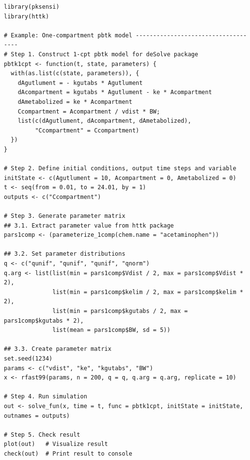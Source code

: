 \documentclass[preprint,12pt, a4paper]{elsarticle}
\begin{document}
\begin{lstlisting}
library(pksensi)
library(httk)

# Example: One-compartment pbtk model ------------------------------------
# Step 1. Construct 1-cpt pbtk model for deSolve package
pbtk1cpt <- function(t, state, parameters) {
  with(as.list(c(state, parameters)), {
    dAgutlument = - kgutabs * Agutlument
    dAcompartment = kgutabs * Agutlument - ke * Acompartment
    dAmetabolized = ke * Acompartment
    Ccompartment = Acompartment / vdist * BW;
    list(c(dAgutlument, dAcompartment, dAmetabolized), 
         "Ccompartment" = Ccompartment) 
  })
}

# Step 2. Define initial conditions, output time steps and variable
initState <- c(Agutlument = 10, Acompartment = 0, Ametabolized = 0)
t <- seq(from = 0.01, to = 24.01, by = 1)
outputs <- c("Ccompartment")

# Step 3. Generate parameter matrix 
## 3.1. Extract parameter value from httk package
pars1comp <- (parameterize_1comp(chem.name = "acetaminophen"))

## 3.2. Set parameter distributions
q <- c("qunif", "qunif", "qunif", "qnorm")
q.arg <- list(list(min = pars1comp$Vdist / 2, max = pars1comp$Vdist * 2),
              list(min = pars1comp$kelim / 2, max = pars1comp$kelim * 2),
              list(min = pars1comp$kgutabs / 2, max = pars1comp$kgutabs * 2),
              list(mean = pars1comp$BW, sd = 5))

## 3.3. Create parameter matrix
set.seed(1234)
params <- c("vdist", "ke", "kgutabs", "BW")
x <- rfast99(params, n = 200, q = q, q.arg = q.arg, replicate = 10)

# Step 4. Run simulation 
out <- solve_fun(x, time = t, func = pbtk1cpt, initState = initState, outnames = outputs)

# Step 5. Check result
plot(out)   # Visualize result
check(out)  # Print result to console
\end{lstlisting}



 


\newpage

\clearpage
\newpage
\end{document}
